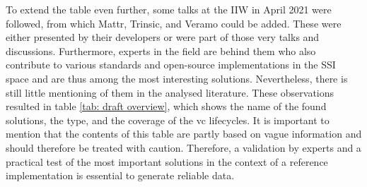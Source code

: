     To extend the table even further, some talks at the \ac{IIW} in April 2021 were followed, from which Mattr, Trinsic, and Veramo could be added. These were either presented by their developers or were part of those very talks and discussions. Furthermore, experts in the field are behind them who also contribute to various standards and open-source implementations in the \ac{SSI} space and are thus among the most interesting solutions. Nevertheless, there is still little mentioning of them in the analysed literature. These observations resulted in table \ref{tab: draft overview}, which shows the name of the found solutions, the type, and the coverage of the \ac{vc} lifecycles. It is important to mention that the contents of this table are partly based on vague information and should therefore be treated with caution. Therefore, a validation by experts and a practical test of the most important solutions in the context of a reference implementation is essential to generate reliable data.

